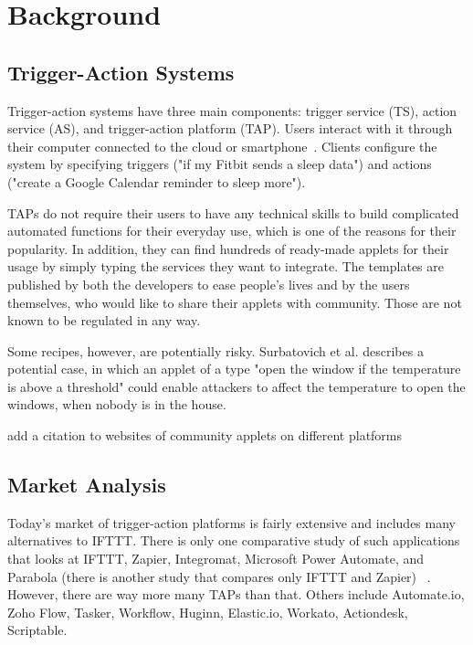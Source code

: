 \section{Background}
\label{sec:background}

\subsection{Trigger-Action Systems}

Trigger-action systems have three main components: trigger service (TS), action service (AS), and
trigger-action platform (TAP). Users interact with it through their computer connected to the cloud or
smartphone~\cite{DBLP:conf/sp/ChenCWSCF21}. Clients configure the system by specifying triggers ("if
my Fitbit sends a sleep data") and actions ("create a Google Calendar reminder to sleep more"). 

TAPs do not require their users to have any technical skills to build complicated automated functions for
their everyday use, which is one of the reasons for their popularity. In addition, they can find hundreds of
ready-made applets for their usage by simply typing the services they want to integrate. The templates
are published by both the developers to ease people's lives and by the users themselves, who would like
to share their applets with community. Those are not known to be regulated in any way. 

Some recipes, however, are potentially risky. Surbatovich et al. describes a potential case, in which an applet of a type "open the window if the temperature is above a threshold" could enable attackers to affect the temperature to open the windows, when nobody is in the house. 

add a citation to websites of community applets on different platforms

\subsection{Market Analysis}
Today's market of trigger-action platforms is fairly extensive and includes many alternatives to IFTTT.
There is only one comparative study of such applications that looks at IFTTT, Zapier, Integromat,
Microsoft Power Automate, and Parabola (there is another study that compares only IFTTT and Zapier)
~\cite{DBLP:conf/icict2/AbdouEF21}. However, there are way more many TAPs than that. Others include
Automate.io, Zoho Flow, Tasker, Workflow, Huginn, Elastic.io,
Workato, Actiondesk, Scriptable. 

